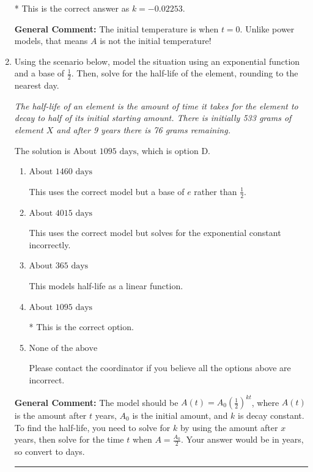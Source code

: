 \documentclass{extbook}[14pt]
\newcommand{\litem}[1]{\item #1

\rule{\textwidth}{0.4pt}}
\begin{document}
\begin{enumerate}
{\begin{enumerate}[label=\Alph*.]
* This is the correct answer as $k = -0.02253$.
\end{enumerate}

\textbf{General Comment:} The initial temperature is when $t = 0$. Unlike power models, that means $A$ is not the initial temperature!
}
\litem{
Using the scenario below, model the situation using an exponential function and a base of $\frac{1}{2}$. Then, solve for the half-life of the element, rounding to the nearest day.

\begin{center}
    \textit{ The half-life of an element is the amount of time it takes for the element to decay to half of its initial starting amount. There is initially 533 grams of element $X$ and after 9 years there is 76 grams remaining. }
\end{center}


The solution is \( \text{About } 1095 \text{ days} \), which is option D.\begin{enumerate}[label=\Alph*.]
\item \( \text{About } 1460 \text{ days} \)

This uses the correct model but a base of $e$ rather than $\frac{1}{2}$.
\item \( \text{About } 4015 \text{ days} \)

This uses the correct model but solves for the exponential constant incorrectly.
\item \( \text{About } 365 \text{ days} \)

This models half-life as a linear function.
\item \( \text{About } 1095 \text{ days} \)

* This is the correct option.
\item \( \text{None of the above} \)

Please contact the coordinator if you believe all the options above are incorrect.
\end{enumerate}

\textbf{General Comment:} The model should be $A(t) = A_0 (\frac{1}{2})^{kt}$, where $A(t)$ is the amount after $t$ years, $A_0$ is the initial amount, and $k$ is decay constant. To find the half-life, you need to solve for $k$ by using the amount after $x$ years, then solve for the time $t$ when $A = \frac{A_0}{2}$. Your answer would be in years, so convert to days.
}
\end{enumerate}
\end{document}
